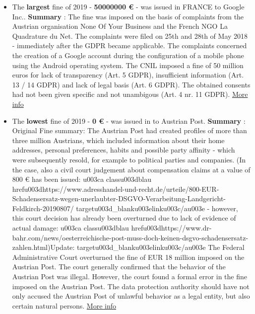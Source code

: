 \documentclass[12pt]{article}
\begin{document}
\newpage
\justify
	\begin{multicols}{2}
	\begin{itemize}
		\item The \textbf{largest} fine of 2019 - \textbf{50000000 €} - was issued in FRANCE to Google Inc..
		\newline
		\textbf{Summary} : The fine was imposed on the basis of complaints from the Austrian organisation None Of Your Business and the French NGO La Quadrature du Net. The complaints were filed on 25th and 28th of May 2018 - immediately after the GDPR became applicable. The complaints concerned the creation of a Google account during the configuration of a mobile phone using the Android operating system. The CNIL imposed a fine of 50 million euros for lack of transparency (Art. 5 GDPR), insufficient information (Art. 13 / 14 GDPR) and lack of legal basis (Art. 6 GDPR). The obtained consents had not been given specific and not unambigous (Art. 4 nr. 11 GDPR).
		\newline
		\href{https://www.cnil.fr/en/cnils-restricted-committee-imposes-financial-penalty-50-million-euros-against-google-llc}{More info}
		\vspace{1cm}
	
		\item The \textbf{lowest} fine of 2019 - \textbf{0 €} - was issued in  to Austrian Post.
		\newline
		\textbf{Summary} : Original Fine summary: The Austrian Post had created profiles of more than three million Austrians, which included information about their home addresses, personal preferences, habits and possible party affinity - which were subsequently resold, for example to political parties and companies. (In the case, also a civil court judgement about compensation claims at a value of 800 € has been issued: u003ca classu003dblau hrefu003dhttps://www.adresshandel-und-recht.de/urteile/800-EUR-Schadensersatz-wegen-unerlaubter-DSGVO-Verarbeitung-Landgericht-Feldkirch-20190807/ targetu003d_blanku003elinku003c/au003e - however, this court decision has already been overturned due to lack of evidence of actual damage: u003ca classu003dblau hrefu003dhttps://www.dr-bahr.com/news/oesterreichische-post-muss-doch-keinen-dsgvo-schadensersatz-zahlen.html)Update: targetu003d_blanku003elinku003c/au003e The Federal Administrative Court overturned the fine of EUR 18 million imposed on the Austrian Post. The court generally confirmed that the behavior of the Austrian Post was illegal. However, the court found a formal error in the fine imposed on the Austrian Post. The data protection authority should have not only accused the Austrian Post of unlawful behavior as a legal entity, but also certain natural persons.
		\newline
		\href{https://wien.orf.at/stories/3019396/}{More info}
	\end{itemize}
	\end{multicols}
\end{document}
